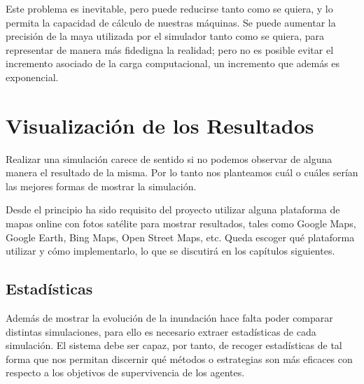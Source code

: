 Este problema es inevitable, pero puede reducirse tanto como se quiera, y lo
permita la capacidad de cálculo de nuestras máquinas. Se puede aumentar la
precisión de la maya utilizada por el simulador tanto como se quiera, para
representar de manera más fidedigna la realidad; pero no es posible evitar el
incremento asociado de la carga computacional, un incremento que además es
exponencial.

\section{Visualización de los Resultados}

Realizar una simulación carece de sentido si no podemos observar de alguna
manera el resultado de la misma. Por lo tanto nos planteamos cuál o cuáles
serían las mejores formas de mostrar la simulación.

Desde el principio ha sido requisito del proyecto utilizar alguna plataforma de
mapas online con fotos satélite para mostrar resultados, tales como Google Maps,
Google Earth, Bing Maps, Open Street Maps, etc. Queda escoger qué plataforma
utilizar y cómo implementarlo, lo que se discutirá en los capítulos siguientes.

\subsection{Estadísticas}

Además de mostrar la evolución de la inundación hace falta poder comparar
distintas simulaciones, para ello es necesario extraer estadísticas de cada
simulación. El sistema debe ser capaz, por tanto, de recoger estadísticas de tal
forma que nos permitan discernir qué métodos o estrategias son más eficaces con
respecto a los objetivos de supervivencia de los agentes.

